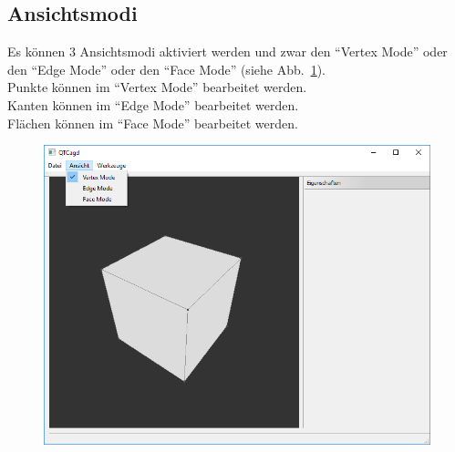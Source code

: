 \subsection{Ansichtsmodi}
Es können 3 Ansichtsmodi aktiviert werden und zwar den "`Vertex Mode"' oder den "`Edge Mode"' oder den "`Face Mode"' (siehe Abb.~\ref{fig:Ansichtsmodi}).\\
Punkte können im "`Vertex Mode"' bearbeitet werden.\\
Kanten können im "`Edge Mode"' bearbeitet werden.\\
Flächen können im "`Face Mode"' bearbeitet werden.
\begin{figure}[ht!]
	\centering
	\includegraphics[scale=0.6]{content/pictures/2-Ansichtsmodi}
	\caption{}
	\label{fig:Ansichtsmodi}
\end{figure}
